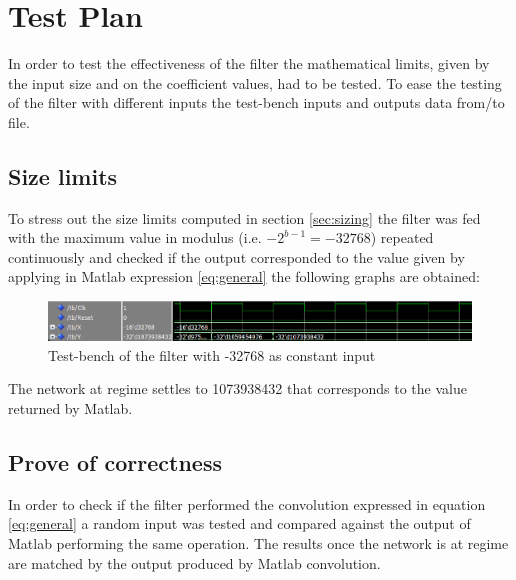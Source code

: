 \section{Test Plan}
In order to test the effectiveness of the filter the mathematical limits, given by the input size and on the coefficient values, had to be tested.
To ease the testing of the filter with different inputs the test-bench inputs and outputs data from/to file.
\subsection{Size limits}
To stress out the size limits computed in section \ref{sec:sizing} the filter was fed with the maximum value in modulus (i.e. $-2^{b-1}= -32768 $) repeated continuously and checked if the output corresponded to the value given by applying in Matlab expression \ref{eq:general} the following graphs are obtained:
\begin{figure}[H]
  \centering
  \includegraphics[width=0.9\linewidth]{./images/simul32768.PNG}
  \caption{Test-bench of the filter with -32768 as constant input}
  \label{fig:32768}
\end{figure}
The network at regime settles to 1073938432 that corresponds to the value returned by Matlab.
\subsection{Prove of correctness}
In order to check if the filter performed the convolution expressed in equation \ref{eq:general} a random input was tested and compared against the output of Matlab performing the same operation. The results once the network is at regime are matched by the output produced by Matlab convolution.
